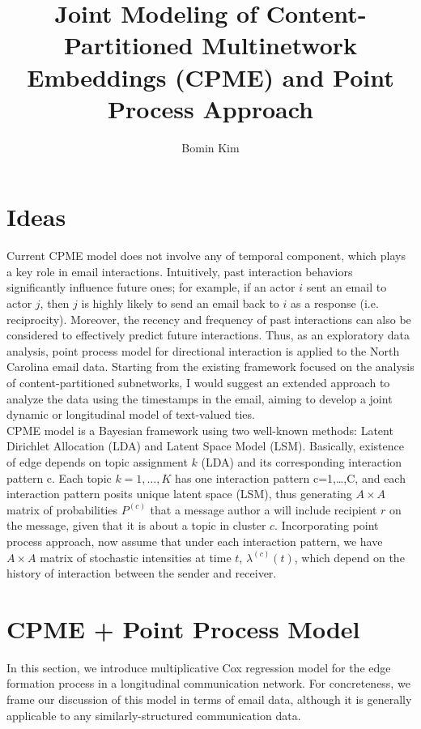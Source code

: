 \documentclass[a4paper]{article}
\title{Joint Modeling of Content-Partitioned Multinetwork Embeddings (CPME) and Point Process Approach}
\author{Bomin Kim}
\begin{document}
\maketitle
\section{Ideas}
Current CPME model does not involve any of temporal component, which plays a key role in email interactions. Intuitively, past interaction behaviors significantly influence future ones; for example, if an actor $i$ sent an email to actor $j$, then $j$ is highly likely to send an email back to $i$ as a response (i.e. reciprocity). Moreover, the recency and frequency of past interactions can also be considered to effectively predict future interactions. Thus, as an exploratory data analysis, point process model for directional interaction is applied to the North Carolina email data. Starting from the existing framework focused on the analysis of content-partitioned subnetworks, I would suggest an extended approach to analyze the data using the timestamps in the email, aiming to develop a joint dynamic or longitudinal model of text-valued ties.\\ \newline
 CPME model is a Bayesian framework using two well-known methods: Latent Dirichlet Allocation (LDA) and Latent Space Model (LSM). Basically, existence of edge depends on topic assignment $k$ (LDA) and its corresponding interaction pattern c. Each topic $k=1,…,K$ has one interaction pattern c=1,…,C, and each interaction pattern posits unique latent space (LSM), thus generating $A\times A$ matrix of probabilities $P^{(c)}$ that a message author
a will include recipient $r$ on the message, given that it is about
a topic in cluster $c$.  Incorporating point process approach, now assume that under each interaction pattern, we have $A\times A$ matrix of stochastic intensities at time $t$, $\lambda^{(c)}(t)$, which depend on the history of interaction between the sender and receiver. 
\newpage
\section{CPME + Point Process Model}
In this section, we introduce multiplicative Cox regression model for the edge formation process in a longitudinal communication network. For concreteness, we frame our discussion of this model in terms of email data, although it is generally applicable to any similarly-structured communication data.
\end{document}
